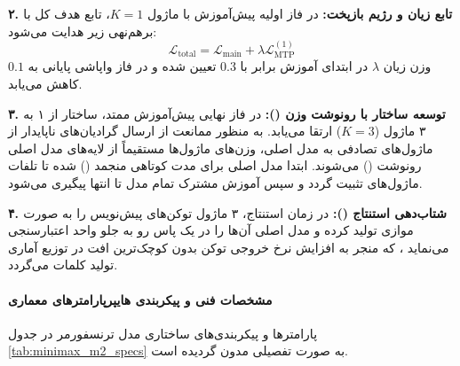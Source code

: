 \textbf{۲. تابع زیان و رژیم بازپخت:}
در فاز اولیه پیش‌آموزش با ماژول $K=1$، تابع هدف کل با برهم‌نهی زیر هدایت می‌شود:
\begin{equation}
    \mathcal{L}_{\text{total}} = \mathcal{L}_{\text{main}} + \lambda \mathcal{L}_{\text{MTP}}^{(1)}
\end{equation}
وزن زیان $\lambda$ در ابتدای آموزش برابر با $0.3$ تعیین شده و در فاز واپاشی پایانی به $0.1$ کاهش می‌یابد.

\textbf{۳. توسعه ساختار با رونوشت وزن ():}
در فاز نهایی پیش‌آموزش ممتد، ساختار  از ۱ به ۳ ماژول ($K=3$) ارتقا می‌یابد. به منظور ممانعت از ارسال گرادیان‌های ناپایدار از ماژول‌های تصادفی به مدل اصلی، وزن‌های ماژول‌ها مستقیماً از لایه‌های مدل اصلی رونوشت () می‌شوند. ابتدا مدل اصلی برای مدت کوتاهی منجمد () شده تا تلفات ماژول‌های  تثبیت گردد و سپس آموزش مشترک تمام مدل تا انتها پیگیری می‌شود.

\textbf{۴. شتاب‌دهی استنتاج ():}
در زمان استنتاج، ۳ ماژول  توکن‌های پیش‌نویس را به صورت موازی تولید کرده و مدل اصلی آن‌ها را در یک پاس رو به جلو واحد اعتبارسنجی می‌نماید \cite{leviathan2023fast}، که منجر به افزایش نرخ خروجی توکن بدون کوچک‌ترین افت در توزیع آماری تولید کلمات می‌گردد.

\paragraph*{مشخصات فنی و پیکربندی هایپرپارامترهای معماری}
پارامترها و پیکربندی‌های ساختاری مدل ترنسفورمر  در جدول \ref{tab:minimax_m2_specs} به صورت تفصیلی مدون گردیده است.

